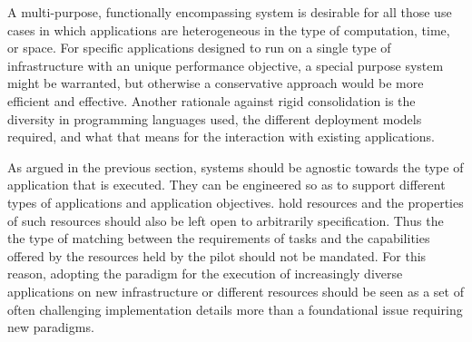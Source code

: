 \documentclass{sig-alternate}
\begin{document}
A multi-purpose, functionally encompassing \pilot system is desirable for all
those use cases in which applications are heterogeneous in the type of
computation, time, or space. For specific applications designed to run on a
single type of infrastructure with an unique performance objective, a special
purpose system might be warranted, but otherwise a conservative approach would
be more efficient and effective. Another rationale against rigid consolidation
is the diversity in programming languages used, the different deployment models
required, and what that means for the interaction with existing applications.

As argued in the previous section, \pilot systems should be agnostic towards the
type of application that is executed. They can be engineered so as to support
different types of applications and application objectives. \pilots hold
resources and the properties of such resources should also be left open to
arbitrarily specification. Thus the the type of matching between the
requirements of tasks and the capabilities offered by the resources held by the
pilot should not be mandated. For this reason, adopting the \pilot paradigm for
the execution of increasingly diverse applications on new infrastructure or
different resources should be seen as a set of often challenging implementation
details more than a foundational issue requiring new paradigms.




\end{document}
